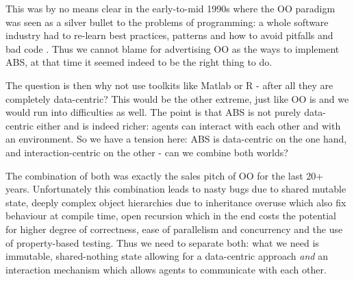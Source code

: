 %
%	 
%	

This was by no means clear in the early-to-mid 1990s where the OO paradigm was seen as a silver bullet to the problems of programming: a whole software industry had to re-learn best practices, patterns \cite{gamma_design_1994} and how to avoid pitfalls and bad code \cite{fowler_refactoring:_2012}. Thus we cannot blame \cite{epstein_growing_1996} for advertising OO as the ways to implement ABS, at that time it seemed indeed to be the right thing to do. 

The question is then why not use toolkits like Matlab or R - after all they are completely data-centric? This would be the other extreme, just like OO is and we would run into difficulties as well. The point is that ABS is not purely data-centric either and is indeed richer: agents can interact with each other and with an environment. So we have a tension here: ABS is data-centric on the one hand, and interaction-centric on the other - can we combine both worlds?

The combination of both was exactly the sales pitch of OO for the last 20+ years. Unfortunately this combination leads to nasty bugs due to shared mutable state, deeply complex object hierarchies due to inheritance overuse which also fix behaviour at compile time, open recursion which in the end costs the potential for higher degree of correctness, ease of parallelism and concurrency and the use of property-based testing. Thus we need to separate both: what we need is immutable, shared-nothing state allowing for a data-centric approach \textit{and} an interaction mechanism which allows agents to communicate with each other.

